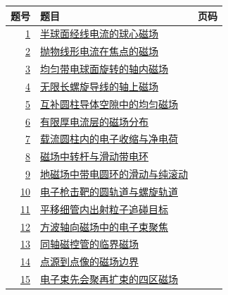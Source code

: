 \documentclass[UTF8,fontset=fandol,a4paper,11pt]{ctexart}
\begin{document}
\begin{longtable}{@{}r p{113mm} r@{}}\toprule 题号 & 题目 & 页码\\\midrule

\hyperref[q:1]{1} & \hyperref[q:1]{半球面经线电流的球心磁场} & \pageref{q:1} \\

\hyperref[q:2]{2} & \hyperref[q:2]{抛物线形电流在焦点的磁场} & \pageref{q:2} \\

\hyperref[q:3]{3} & \hyperref[q:3]{均匀带电球面旋转的轴内磁场} & \pageref{q:3} \\

\hyperref[q:4]{4} & \hyperref[q:4]{无限长螺旋导线的轴上磁场} & \pageref{q:4} \\

\hyperref[q:5]{5} & \hyperref[q:5]{互补圆柱导体空隙中的均匀磁场} & \pageref{q:5} \\

\hyperref[q:6]{6} & \hyperref[q:6]{有限厚电流层的磁场分布} & \pageref{q:6} \\

\hyperref[q:7]{7} & \hyperref[q:7]{载流圆柱内的电子收缩与净电荷} & \pageref{q:7} \\

\hyperref[q:8]{8} & \hyperref[q:8]{磁场中转杆与滑动带电环} & \pageref{q:8} \\

\hyperref[q:9]{9} & \hyperref[q:9]{地磁场中带电圆环的滑动与纯滚动} & \pageref{q:9} \\

\hyperref[q:10]{10} & \hyperref[q:10]{电子枪击靶的圆轨道与螺旋轨道} & \pageref{q:10} \\

\hyperref[q:11]{11} & \hyperref[q:11]{平移细管内出射粒子追碰目标} & \pageref{q:11} \\

\hyperref[q:12]{12} & \hyperref[q:12]{方波轴向磁场中的电子束聚焦} & \pageref{q:12} \\

\hyperref[q:13]{13} & \hyperref[q:13]{同轴磁控管的临界磁场} & \pageref{q:13} \\

\hyperref[q:14]{14} & \hyperref[q:14]{点源到点像的磁场边界} & \pageref{q:14} \\

\hyperref[q:15]{15} & \hyperref[q:15]{电子束先会聚再扩束的四区磁场} & \pageref{q:15} \\


\end{longtable}
\end{document}

